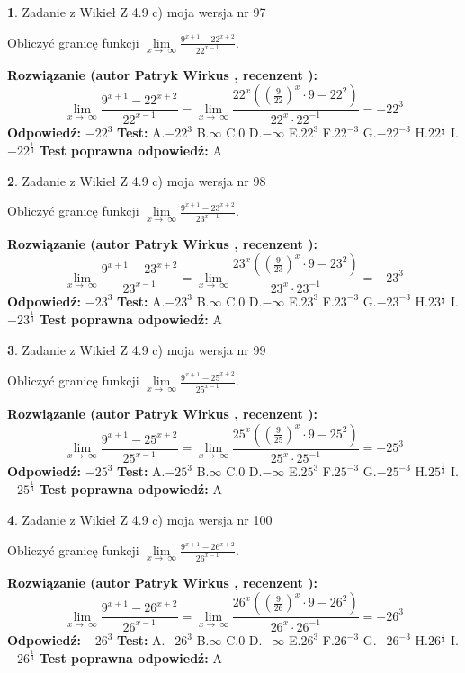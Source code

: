 \documentclass[12pt, a4paper]{article}
\theoremstyle{definition} %
\newtheorem{zad}{}
\newcommand{\zadStart}[1]{\begin{zad}#1\newline}
\newcommand{\zadStop}{\end{zad}}
\newcommand{\rozwStart}[2]{\noindent \textbf{Rozwiązanie (autor #1 , recenzent #2): }\newline}
\newcommand{\rozwStop}{\newline}
\newcommand{\odpStart}{\noindent \textbf{Odpowiedź:}\newline}
\newcommand{\odpStop}{\newline}
\newcommand{\testStart}{\noindent \textbf{Test:}\newline}
\newcommand{\testStop}{\newline}
\newcommand{\kluczStart}{\noindent \textbf{Test poprawna odpowiedź:}\newline}
\newcommand{\kluczStop}{\newline}
\begin{document}
\zadStart{Zadanie z Wikieł Z 4.9 c) moja wersja nr 97}


Obliczyć granicę funkcji  $\lim\limits_{x\to\ \infty}\frac{9^{x+1}-22^{x+2}}{22^{x-1}}$.
\zadStop
\rozwStart{Patryk Wirkus}{}
$$\lim\limits_{x\to\ \infty}\frac{9^{x+1}-22^{x+2}}{22^{x-1}}=\lim\limits_{x\to\ \infty}\frac{22^{x}((\frac{9}{22})^{x}\cdot 9 -22^{2})}{22^{x}\cdot 22^{-1}} = -22^{3}$$
\rozwStop
\odpStart
$-22^{3}$
\odpStop
\testStart
A.$-22^{3}$ B.$\infty$ C.$0$ D.$-\infty$ E.$22^{3}$
F.$22^{-3}$ G.$-22^{-3}$
H.$22^{\frac{1}{3}}$
I.$-22^{\frac{1}{3}}$
\testStop
\kluczStart
A
\kluczStop



\zadStart{Zadanie z Wikieł Z 4.9 c) moja wersja nr 98}


Obliczyć granicę funkcji  $\lim\limits_{x\to\ \infty}\frac{9^{x+1}-23^{x+2}}{23^{x-1}}$.
\zadStop
\rozwStart{Patryk Wirkus}{}
$$\lim\limits_{x\to\ \infty}\frac{9^{x+1}-23^{x+2}}{23^{x-1}}=\lim\limits_{x\to\ \infty}\frac{23^{x}((\frac{9}{23})^{x}\cdot 9 -23^{2})}{23^{x}\cdot 23^{-1}} = -23^{3}$$
\rozwStop
\odpStart
$-23^{3}$
\odpStop
\testStart
A.$-23^{3}$ B.$\infty$ C.$0$ D.$-\infty$ E.$23^{3}$
F.$23^{-3}$ G.$-23^{-3}$
H.$23^{\frac{1}{3}}$
I.$-23^{\frac{1}{3}}$
\testStop
\kluczStart
A
\kluczStop



\zadStart{Zadanie z Wikieł Z 4.9 c) moja wersja nr 99}


Obliczyć granicę funkcji  $\lim\limits_{x\to\ \infty}\frac{9^{x+1}-25^{x+2}}{25^{x-1}}$.
\zadStop
\rozwStart{Patryk Wirkus}{}
$$\lim\limits_{x\to\ \infty}\frac{9^{x+1}-25^{x+2}}{25^{x-1}}=\lim\limits_{x\to\ \infty}\frac{25^{x}((\frac{9}{25})^{x}\cdot 9 -25^{2})}{25^{x}\cdot 25^{-1}} = -25^{3}$$
\rozwStop
\odpStart
$-25^{3}$
\odpStop
\testStart
A.$-25^{3}$ B.$\infty$ C.$0$ D.$-\infty$ E.$25^{3}$
F.$25^{-3}$ G.$-25^{-3}$
H.$25^{\frac{1}{3}}$
I.$-25^{\frac{1}{3}}$
\testStop
\kluczStart
A
\kluczStop



\zadStart{Zadanie z Wikieł Z 4.9 c) moja wersja nr 100}


Obliczyć granicę funkcji  $\lim\limits_{x\to\ \infty}\frac{9^{x+1}-26^{x+2}}{26^{x-1}}$.
\zadStop
\rozwStart{Patryk Wirkus}{}
$$\lim\limits_{x\to\ \infty}\frac{9^{x+1}-26^{x+2}}{26^{x-1}}=\lim\limits_{x\to\ \infty}\frac{26^{x}((\frac{9}{26})^{x}\cdot 9 -26^{2})}{26^{x}\cdot 26^{-1}} = -26^{3}$$
\rozwStop
\odpStart
$-26^{3}$
\odpStop
\testStart
A.$-26^{3}$ B.$\infty$ C.$0$ D.$-\infty$ E.$26^{3}$
F.$26^{-3}$ G.$-26^{-3}$
H.$26^{\frac{1}{3}}$
I.$-26^{\frac{1}{3}}$
\testStop
\kluczStart
A
\kluczStop
\end{document}
